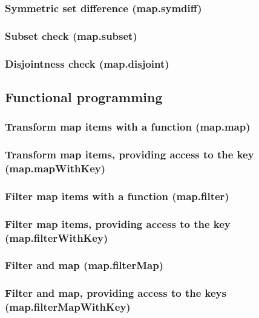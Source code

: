 \documentclass{article}
\theoremstyle{definition}
\begin{document}
\subsubsection{Symmetric set difference (map.symdiff)}

\subsubsection{Subset check (map.subset)}

\subsubsection{Disjointness check (map.disjoint)}

\subsection{Functional programming}

\subsubsection{Transform map items with a function (map.map)}

\subsubsection{Transform map items, providing access to the key (map.mapWithKey)}

\subsubsection{Filter map items with a function (map.filter)}

\subsubsection{Filter map items, providing access to the key (map.filterWithKey)}

\subsubsection{Filter and map (map.filterMap)}

\subsubsection{Filter and map, providing access to the keys (map.filterMapWithKey)}
\end{document}
